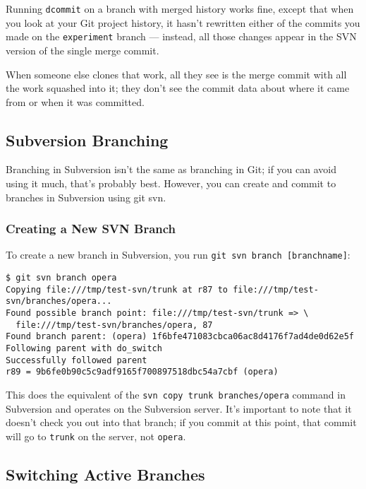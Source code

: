 \documentclass[a4paper]{book}
\begin{document}
Running \texttt{dcommit} on a branch with merged history works fine, except that when you look at your Git project history, it hasn't rewritten either of the commits you made on the \texttt{experiment} branch --- instead, all those changes appear in the SVN version of the single merge commit.

When someone else clones that work, all they see is the merge commit with all the work squashed into it; they don't see the commit data about where it came from or when it was committed.

\subsection{Subversion Branching}

Branching in Subversion isn't the same as branching in Git; if you can avoid using it much, that's probably best. However, you can create and commit to branches in Subversion using git svn.

\subsubsection{Creating a New SVN Branch}

To create a new branch in Subversion, you run \texttt{git svn branch {[}branchname{]}}:

\begin{shaded}\begin{verbatim}
$ git svn branch opera
Copying file:///tmp/test-svn/trunk at r87 to file:///tmp/test-svn/branches/opera...
Found possible branch point: file:///tmp/test-svn/trunk => \
  file:///tmp/test-svn/branches/opera, 87
Found branch parent: (opera) 1f6bfe471083cbca06ac8d4176f7ad4de0d62e5f
Following parent with do_switch
Successfully followed parent
r89 = 9b6fe0b90c5c9adf9165f700897518dbc54a7cbf (opera)
\end{verbatim}\end{shaded}

This does the equivalent of the \texttt{svn copy trunk branches/opera} command in Subversion and operates on the Subversion server. It's important to note that it doesn't check you out into that branch; if you commit at this point, that commit will go to \texttt{trunk} on the server, not \texttt{opera}.

\subsection{Switching Active Branches}
\end{document}
